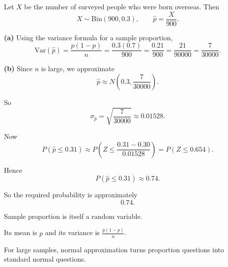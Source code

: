 \begin{solution}
Let $X$ be the number of surveyed people who were born overseas. Then
\[
X\sim \mathrm{Bin}(900,0.3),
\qquad
\hat p=\frac{X}{900}.
\]

\textbf{(a)} Using the variance formula for a sample proportion,
\[
\mathrm{Var}(\hat p)=\frac{p(1-p)}{n}
=\frac{0.3(0.7)}{900}
=\frac{0.21}{900}
=\frac{21}{90000}
=\frac7{30000}.
\]

\textbf{(b)} Since $n$ is large, we approximate
\[
\hat p \approx N\left(0.3,\frac7{30000}\right).
\]

So
\[
\sigma_{\hat p}=\sqrt{\frac7{30000}}\approx 0.01528.
\]

Now
\[
P(\hat p\le 0.31)\approx P\left(Z\le \frac{0.31-0.30}{0.01528}\right)
=P(Z\le 0.654).
\]

Hence
\[
P(\hat p\le 0.31)\approx 0.74.
\]

So the required probability is approximately
\[
\boxed{0.74}.
\]
\end{solution}

\begin{takeaways}
\item Sample proportion is itself a random variable.
\item Its mean is $p$ and its variance is $\frac{p(1-p)}{n}$.
\item For large samples, normal approximation turns proportion questions into standard normal questions.
\end{takeaways}
